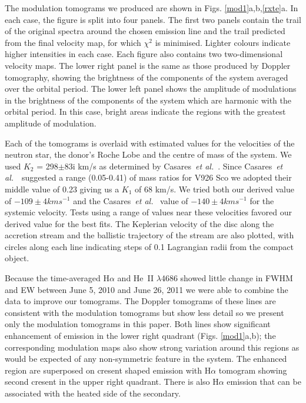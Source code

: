 \documentclass{aa}
\def\etal{{\em et al.}\ }
\begin{document}
The modulation tomograms we produced are shown in Figs. \ref{mod1}a,b,\ref{rxte}a. 
In each case, the figure is split into four panels. The first two panels contain the trail of the original spectra around the chosen emission line and the trail predicted from the final velocity map, for which $\chi^2$ is minimised. Lighter colours indicate higher intensities in each case. 
Each figure also contains two two-dimensional velocity maps. The lower
right panel is the same as those produced by Doppler tomography, 
showing the brightness of the components of the system averaged over the orbital period. The lower left panel shows the amplitude of modulations in the brightness of the components of the system which are harmonic with the orbital period. In this case, bright areas indicate the regions with the greatest amplitude of modulation.

Each of the tomograms is overlaid with estimated values for the velocities of the neutron star, the donor's Roche Lobe and the centre of mass of the system. 
We used $K_2$ = 298$\pm$83i km/s  as determined by Casares~\etal \cite{casares}. 
Since Casares~\etal~suggested a range (0.05-0.41) 
of mass ratios for V926 Sco we adopted their 
middle value of 0.23 giving us a $K_1$ of 68 km/s.
We tried both our derived value of $-109\pm 4 km s^{-1}$ and the Casares~\etal
value of $-140\pm4 km s^{-1}$ for the systemic velocity. Tests
using a range of values near these velocities favored our
derived value for the best fits. 
The Keplerian velocity of the disc along the accretion stream and the ballistic trajectory of the stream are also plotted, with circles along each line indicating steps of 0.1 Lagrangian radii from the compact object. 


Because the time-averaged H$\alpha$   
and He~II $\lambda$4686 showed little change in FWHM and EW between 
June 5, 2010 and June 26, 2011 we were able to combine the
data to improve our tomograms.   
The Doppler tomograms of these lines are consistent with the
modulation tomograms but show less detail so we present only the
modulation tomograms in this paper.
Both lines show significant enhancement of emission  
in the lower right quadrant (Figs. \ref{mod1}a,b); 
the corresponding modulation maps also  
show strong variation around this regions as would be expected of 
any non-symmetric feature in the system.
The enhanced region are superposed on cresent shaped
emission with H$\alpha$ tomogram showing second cresent 
in the upper right quadrant.  
There is also H$\alpha$ emission that can be associated with
the heated side of the secondary.
\end{document}
